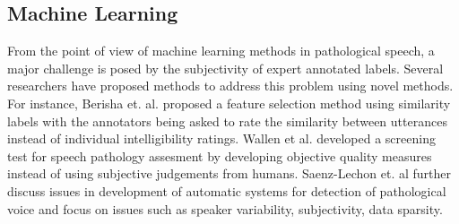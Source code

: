 \documentclass{article}
\begin{document}
\subsection{Machine Learning}
From the point of view of machine learning methods in pathological speech, a major challenge is posed by the subjectivity of expert annotated labels.
Several researchers have proposed methods to address this problem using novel methods.
For instance, Berisha et. al. \cite{berisha2014modeling} proposed a feature selection method using similarity labels with the annotators being asked to rate the similarity between utterances instead of individual intelligibility ratings. 
Wallen et al. \cite{wallen1996screening} developed a screening test for speech pathology assesment by developing objective quality measures instead of using subjective judgements from humans.
Saenz-Lechon et. al \cite{saenz2006methodological} further discuss issues in development of automatic systems for detection of pathological voice and focus on issues such as speaker variability, subjectivity, data sparsity.
\end{document}
